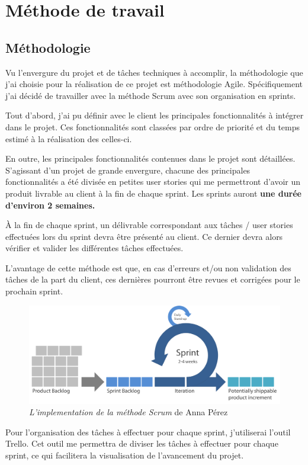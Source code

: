\section{Méthode de travail}

\subsection{Méthodologie}

Vu l'envergure du projet et de tâches techniques à accomplir, la méthodologie que j’ai choisie pour la réalisation de ce projet est méthodologie Agile.
Spécifiquement j'ai décidé de travailler avec la méthode Scrum avec son organisation en sprints.

Tout d'abord, j'ai pu définir avec le client les principales fonctionnalités à intégrer dans le projet. Ces fonctionnalités sont classées par ordre de priorité et du temps estimé à la réalisation des celles-ci.

En outre, les principales fonctionnalités contenues dans le projet sont détaillées. S'agissant d'un projet de grande envergure, chacune des principales fonctionnalités a été divisée en petites user stories qui me permettront d'avoir un produit livrable au client à la fin de chaque sprint. Les sprints auront \textbf{une durée d’environ 2 semaines.}

À la fin de chaque sprint, un délivrable correspondant aux tâches / user stories effectuées lors du sprint devra être présenté au client. Ce dernier devra alors vérifier et valider les différentes tâches effectuées.

L'avantage de cette méthode est que, en cas d'erreurs et/ou non validation des tâches de la part du client, ces dernières pourront être revues et corrigées pour le prochain sprint.

\begin{figure}[H]
  \centering
  \includegraphics[width=0.75\linewidth]{img/agile.png}
  \caption{ \textit{L'implementation de la méthode Scrum} de Anna Pérez}
  \label{agile}
\end{figure}
Pour l’organisation des tâches à effectuer pour chaque sprint, j’utiliserai l’outil Trello. Cet outil me permettra de diviser les tâches à effectuer pour chaque sprint, ce qui facilitera la visualisation de l’avancement du projet.

